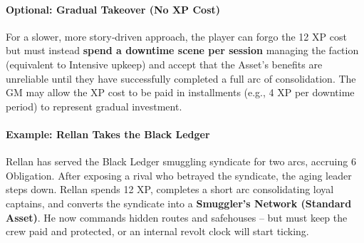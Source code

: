 \begin{tcolorbox}[colback=black!3!white,colframe=black!60!white,title={From Faction to Asset: Taking Over a Terrestrial Patron}]
\paragraph{Optional: Gradual Takeover (No XP Cost)}
For a slower, more story‑driven approach, the player can forgo the 12 XP cost but must instead \textbf{spend a downtime scene per session} managing the faction (equivalent to Intensive upkeep) and accept that the Asset’s benefits are unreliable until they have successfully completed a full arc of consolidation. The GM may allow the XP cost to be paid in installments (e.g., 4 XP per downtime period) to represent gradual investment.

\paragraph{Example: Rellan Takes the Black Ledger}
Rellan has served the Black Ledger smuggling syndicate for two arcs, accruing 6 Obligation. After exposing a rival who betrayed the syndicate, the aging leader steps down. Rellan spends 12 XP, completes a short arc consolidating loyal captains, and converts the syndicate into a \textbf{Smuggler’s Network (Standard Asset)}. He now commands hidden routes and safehouses – but must keep the crew paid and protected, or an internal revolt clock will start ticking.
\end{tcolorbox}